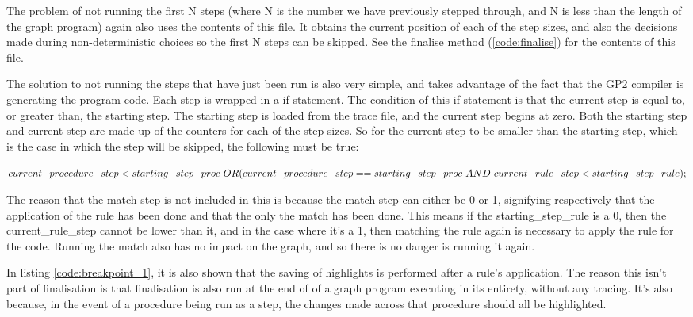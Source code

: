 \documentclass{UoYCSproject}
\begin{document}
The problem of not running the first N steps (where N is the number we have previously stepped through, and N is less than the length of the graph program) again also uses the contents of this file. It obtains the current position of each of the step sizes, and also the decisions made during non-deterministic choices so the first N steps can be skipped. See the finalise method (\ref{code:finalise}) for the contents of this file.

The solution to not running the steps that have just been run is also very simple, and takes advantage of the fact that the GP2 compiler is generating the program code. Each step is wrapped in a if statement. The condition of this if statement is that the current step is equal to, or greater than, the starting step. The starting step is loaded from the trace file, and the current step begins at zero. Both the starting step and current step are made up of the counters for each of the step sizes. So for the current step to be smaller than the starting step, which is the case in which the step will be skipped, the following must be true:

$current\_procedure\_step < starting\_step\_proc\ OR \\
(current\_procedure\_step == starting\_step\_proc\ AND\ current\_rule\_step < starting\_step\_rule);$

The reason that the match step is not included in this is because the match step can either be 0 or 1, signifying respectively that the application of the rule has been done and that the only the match has been done. This means if the starting\_step\_rule is a 0, then the current\_rule\_step cannot be lower than it, and in the case where it's a 1, then matching the rule again is necessary to apply the rule for the code. Running the match also has no impact on the graph, and so there is no danger is running it again.

In listing \ref{code:breakpoint_1}, it is also shown that the saving of highlights is performed after a rule's application. The reason this isn't part of finalisation is that finalisation is also run at the end of of a graph program executing in its entirety, without any tracing. It's also because, in the event of a procedure being run as a step, the changes made across that procedure should all be highlighted.
\end{document}

